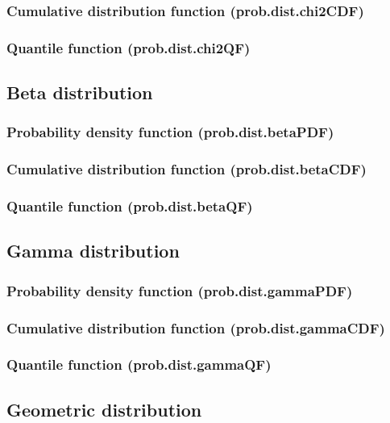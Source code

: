 \documentclass{article}
\theoremstyle{definition}
\begin{document}
\subsubsection{Cumulative distribution function (prob.dist.chi2CDF)}
\subsubsection{Quantile function (prob.dist.chi2QF)}

\subsection{Beta distribution}
\subsubsection{Probability density function (prob.dist.betaPDF)}
\subsubsection{Cumulative distribution function (prob.dist.betaCDF)}
\subsubsection{Quantile function (prob.dist.betaQF)}

\subsection{Gamma distribution}
\subsubsection{Probability density function (prob.dist.gammaPDF)}
\subsubsection{Cumulative distribution function (prob.dist.gammaCDF)}
\subsubsection{Quantile function (prob.dist.gammaQF)}

\subsection{Geometric distribution}
\end{document}
